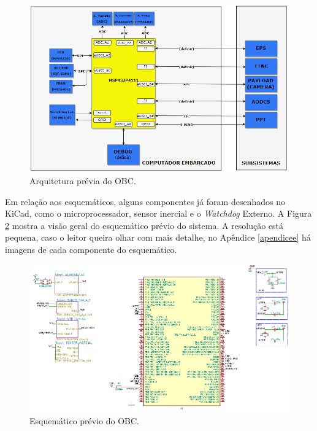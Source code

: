 \begin{figure}[h]
	\centering
\includegraphics[keepaspectratio=true,scale=0.78]{figuras/arquiteturaHard2.PNG}
	\caption{Arquitetura prévia do OBC.}
	\label{arquiteturaOBC}
\end{figure}

	Em relação aos esquemáticos, alguns componentes já foram desenhados no KiCad, como o microprocessador, sensor inercial e o \textit{Watchdog} Externo. A Figura \ref{arquiteturaOBC} mostra a visão geral do esquemático  prévio do sistema. A resolução está pequena, caso o leitor queira olhar com mais detalhe, no Apêndice \ref{apendicee} há imagens de cada componente do esquemático.
    
\newpage

\begin{figure}[h]
	\centering
\includegraphics[keepaspectratio=true,scale=0.7]{figuras/esquematico.PNG}
	\caption{Esquemático prévio do OBC.}
	\label{arquiteturaOBC}
\end{figure}

